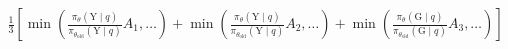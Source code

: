 \documentclass[preview]{standalone}
\begin{document}
\begin{align*}
\frac{1}{3} \left[ \min \left( \frac{\pi_\theta(\text{Y} \mid q)}{\pi_{\theta_{\text{old}}}(\text{Y} \mid q)} A_1, \dots \right) + \min \left( \frac{\pi_\theta(\text{Y} \mid q)}{\pi_{\theta_{\text{old}}}(\text{Y} \mid q)} A_2, \dots \right) + \min \left( \frac{\pi_\theta(\text{G} \mid q)}{\pi_{\theta_{\text{old}}}(\text{G} \mid q)} A_3, \dots \right) \right]
\end{align*}
\end{document}
